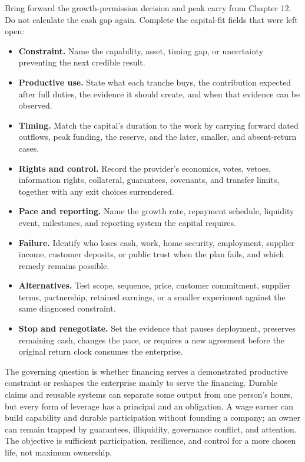 Bring forward the growth-permission decision and peak carry from Chapter 12.
Do not calculate the cash gap again. Complete the capital-fit fields that were
left open:

\begin{itemize}[leftmargin=0pt,label={},labelsep=0pt,itemsep=0.16em,
  parsep=0pt,topsep=0.35em]
\item \textbf{Constraint.} Name the capability, asset, timing gap, or uncertainty
  preventing the next credible result.
\item \textbf{Productive use.} State what each tranche buys, the contribution
  expected after full duties, the evidence it should create, and when that
  evidence can be observed.
\item \textbf{Timing.} Match the capital's duration to the work by carrying
  forward dated outflows, peak funding, the reserve, and the later, smaller,
  and absent-return cases.
\item \textbf{Rights and control.} Record the provider's economics, votes,
  vetoes, information rights, collateral, guarantees, covenants, and transfer
  limits, together with any exit choices surrendered.
\item \textbf{Pace and reporting.} Name the growth rate, repayment schedule,
  liquidity event, milestones, and reporting system the capital requires.
\item \textbf{Failure.} Identify who loses cash, work, home security,
  employment, supplier income, customer deposits, or public trust when the
  plan fails, and which remedy remains possible.
\item \textbf{Alternatives.} Test scope, sequence, price, customer commitment,
  supplier terms, partnership, retained earnings, or a smaller experiment
  against the same diagnosed constraint.
\item \textbf{Stop and renegotiate.} Set the evidence that pauses deployment,
  preserves remaining cash, changes the pace, or requires a new agreement
  before the original return clock consumes the enterprise.
\end{itemize}

The governing question is whether financing serves a demonstrated productive
constraint or reshapes the enterprise mainly to serve the financing. Durable
claims and reusable systems can separate some output from one person's hours,
but every form of leverage has a principal and an obligation. A wage earner can
build capability and durable participation without founding a company; an
owner can remain trapped by guarantees, illiquidity, governance conflict, and
attention. The objective is sufficient participation, resilience, and control
for a more chosen life, not maximum ownership.

